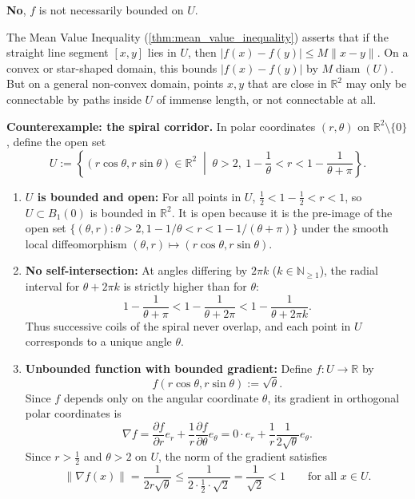 \begin{exercisesolution}
\label{sol:bounded_gradient_unbounded_function}
\textbf{No}, $f$ is not necessarily bounded on $U$.

The Mean Value Inequality (\cref{thm:mean_value_inequality}) asserts that if the straight line
segment $[x, y]$ lies in $U$, then $|f(x) - f(y)| \leq M \|x - y\|$. On a convex or star-shaped domain,
this bounds $|f(x) - f(y)|$ by $M \operatorname{diam}(U)$. But on a general non-convex domain, points
$x, y$ that are close in $\mathbb{R}^2$ may only be connectable by paths inside $U$ of immense length,
or not connectable at all.

\textbf{Counterexample: the spiral corridor.}
In polar coordinates $(r, \theta)$ on $\mathbb{R}^2 \setminus \{0\}$, define the open set
\[
U := \left\{ (r\cos\theta, r\sin\theta) \in \mathbb{R}^2 \;\middle|\; \theta > 2, \ 1 - \frac{1}{\theta} < r < 1 - \frac{1}{\theta + \pi} \right\}.
\]
\begin{enumerate}[label=\textbf{(\arabic*)}]
  \item \textbf{$U$ is bounded and open:} For all points in $U$, $\frac{1}{2} < 1 - \frac{1}{2} < r < 1$, so $U \subset B_1(0)$ is bounded in $\mathbb{R}^2$. It is open because it is the pre-image of the open set $\{(\theta, r) : \theta > 2, 1 - 1/\theta < r < 1 - 1/(\theta+\pi)\}$ under the smooth local diffeomorphism $(\theta, r) \mapsto (r\cos\theta, r\sin\theta)$.
  \item \textbf{No self-intersection:} At angles differing by $2\pi k$ ($k \in \mathbb{N}_{\geq 1}$), the radial interval for $\theta + 2\pi k$ is strictly higher than for $\theta$:
    \[1 - \frac{1}{\theta + \pi} < 1 - \frac{1}{\theta + 2\pi} < 1 - \frac{1}{\theta + 2\pi k}.\]
    Thus successive coils of the spiral never overlap, and each point in $U$ corresponds to a unique angle $\theta$.
  \item \textbf{Unbounded function with bounded gradient:} Define $f : U \to \mathbb{R}$ by
    \[f(r\cos\theta, r\sin\theta) := \sqrt{\theta}.\]
    Since $f$ depends only on the angular coordinate $\theta$, its gradient in orthogonal polar coordinates is
    \[\nabla f = \frac{\partial f}{\partial r} e_r + \frac{1}{r} \frac{\partial f}{\partial \theta} e_\theta = 0 \cdot e_r + \frac{1}{r} \frac{1}{2\sqrt{\theta}} e_\theta.\]
    Since $r > \frac{1}{2}$ and $\theta > 2$ on $U$, the norm of the gradient satisfies
    \[\|\nabla f(x)\| = \frac{1}{2r\sqrt{\theta}} \leq \frac{1}{2 \cdot \frac{1}{2} \cdot \sqrt{2}} = \frac{1}{\sqrt{2}} < 1 \qquad \text{for all } x \in U.\]

\end{enumerate}
\end{exercisesolution}
